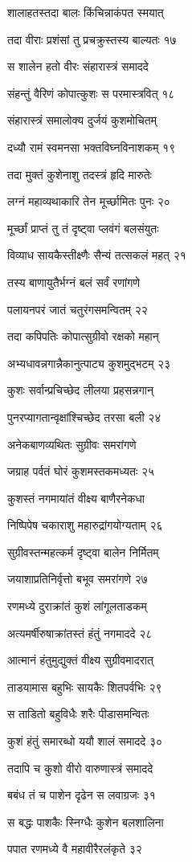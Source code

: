शालाहतस्तदा बालः किंचिन्नाकंपत स्मयात्

तदा वीराः प्रशंसां तु प्रचक्रुस्तस्य बाल्यतः १७

स शालेन हतो वीरः संहारास्त्रं समाददे

संहन्तुं वैरिणं कोपात्कुशः स परमास्त्रवित् १८

संहारास्त्रं समालोक्य दुर्जयं कुशमोचितम्

दध्यौ रामं स्वमनसा भक्तविघ्नविनाशकम् १९

तदा मुक्तं कुशेनाशु तदस्त्रं हृदि मारुतेः

लग्नं महाव्यथाकारि तेन मूर्च्छामितः पुनः २०

मूर्च्छां प्राप्तं तु तं दृष्ट्वा प्लवंगं बलसंयुतः

विव्याध सायकैस्तीक्ष्णैः सैन्यं तत्सकलं महत् २१

तस्य बाणायुतैर्भग्नं बलं सर्वं रणांगणे

पलायनपरं जातं चतुरंगसमन्वितम् २२

तदा कपिपतिः कोपात्सुग्रीवो रक्षको महान्

अभ्यधावन्नगान्नैकानुत्पाट्य कुशमुद्भटम् २३

कुशः सर्वान्प्रचिच्छेद लीलया प्रहसन्नगान्

पुनरप्यागतान्वृक्षांश्चिच्छेद तरसा बली २४

अनेकबाणव्यथितः सुग्रीवः समरांगणे

जग्राह पर्वतं घोरं कुशमस्तकमध्यतः २५

कुशस्तं नगमायांतं वीक्ष्य बाणैरनेकधा

निष्पिपेष चकाराशु महारुद्रांगयोग्यताम् २६

सुग्रीवस्तन्महत्कर्म दृष्ट्वा बालेन निर्मितम्

जयाशाप्रतिनिर्वृत्तो बभूव समरांगणे २७

रणमध्ये दुराक्रांतं कुशं लांगूलताडकम्

अत्यमर्षीरुषाक्रांतस्तं हंतुं नगमाददे २८

आत्मानं हंतुमुद्युक्तं वीक्ष्य सुग्रीवमादरात्

ताडयामास बहुभिः सायकैः शितपर्वभिः २९

स ताडितो बहुविधैः शरैः पीडासमन्वितः

कुशं हंतुं समारब्धो ययौ शालं समाददे ३०

तदापि च कुशो वीरो वारुणास्त्रं समाददे

बबंध तं च पाशेन दृढेन स लवाग्रजः ३१

स बद्धः पाशकैः स्निग्धैः कुशेन बलशालिना

पपात रणमध्ये वै महावीरैरलंकृते ३२

